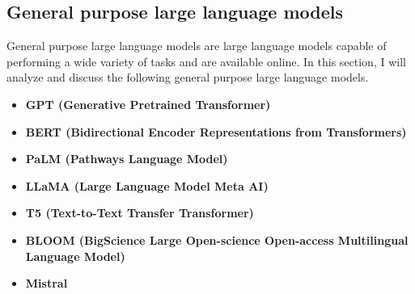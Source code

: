 \newpage
\subsection{General purpose large language models}
General purpose large language models are large language models capable of performing a wide variety of tasks and are available online. In this section, I will analyze and discuss the following general purpose large language models.
\begin{itemize}
    \item \textbf{GPT (Generative Pretrained Transformer)}
    \item \textbf{BERT (Bidirectional Encoder Representations from Transformers)}

    \item \textbf{PaLM (Pathways Language Model)}

    \item \textbf{LLaMA (Large Language Model Meta AI)}

    \item \textbf{T5 (Text-to-Text Transfer Transformer)}
    
    \item \textbf{BLOOM (BigScience Large Open-science Open-access Multilingual Language Model)}

    \item \textbf{Mistral}
\end{itemize}

